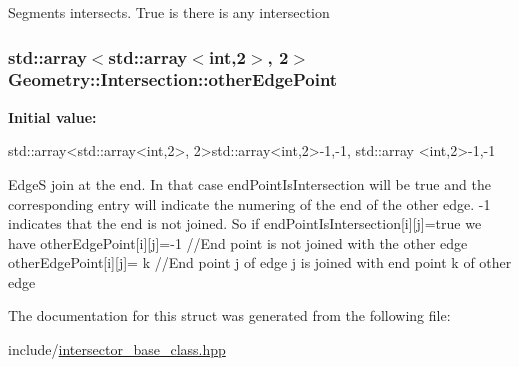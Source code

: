 Segments intersects. True is there is any intersection \hypertarget{structGeometry_1_1Intersection_a15cd54d14fc1ddc1f4499dc49e1d5508}{
\subsubsection[{otherEdgePoint}]{\setlength{\rightskip}{0pt plus 5cm}std::array$<$std::array$<$int,2$>$, 2$>$ {\bf Geometry::Intersection::otherEdgePoint}}}
\label{structGeometry_1_1Intersection_a15cd54d14fc1ddc1f4499dc49e1d5508}
{\bfseries Initial value:}
\begin{DoxyCode}

            std::array<std::array<int,2>, 2>{std::array<int,2>{-1,-1}, std::array
      <int,2>{-1,-1}}
\end{DoxyCode}
EdgeS join at the end. In that case endPointIsIntersection will be true and the corresponding entry will indicate the numering of the end of the other edge. -\/1 indicates that the end is not joined. So if endPointIsIntersection\mbox{[}i\mbox{]}\mbox{[}j\mbox{]}=true we have otherEdgePoint\mbox{[}i\mbox{]}\mbox{[}j\mbox{]}=-\/1 //End point is not joined with the other edge otherEdgePoint\mbox{[}i\mbox{]}\mbox{[}j\mbox{]}= k //End point j of edge j is joined with end point k of other edge 

The documentation for this struct was generated from the following file:\begin{DoxyCompactItemize}
\item 
include/\hyperlink{intersector__base__class_8hpp}{intersector\_\-base\_\-class.hpp}\end{DoxyCompactItemize}
